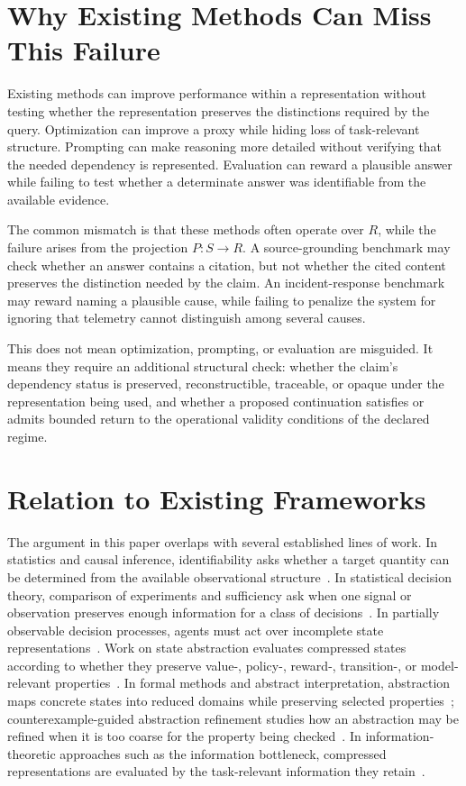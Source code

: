 \documentclass[11pt]{article}
\begin{document}
\section{Why Existing Methods Can Miss This Failure}

Existing methods can improve performance within a representation without testing whether the representation preserves the distinctions required by the query. Optimization can improve a proxy while hiding loss of task-relevant structure. Prompting can make reasoning more detailed without verifying that the needed dependency is represented. Evaluation can reward a plausible answer while failing to test whether a determinate answer was identifiable from the available evidence.

The common mismatch is that these methods often operate over $R$, while the failure arises from the projection $P:S\rightarrow R$. A source-grounding benchmark may check whether an answer contains a citation, but not whether the cited content preserves the distinction needed by the claim. An incident-response benchmark may reward naming a plausible cause, while failing to penalize the system for ignoring that telemetry cannot distinguish among several causes.

This does not mean optimization, prompting, or evaluation are misguided. It means they require an additional structural check: whether the claim's dependency status is preserved, reconstructible, traceable, or opaque under the representation being used, and whether a proposed continuation satisfies or admits bounded return to the operational validity conditions of the declared regime.

\section{Relation to Existing Frameworks}

The argument in this paper overlaps with several established lines of work. In statistics and causal inference, identifiability asks whether a target quantity can be determined from the available observational structure~\cite{Pearl2009}. In statistical decision theory, comparison of experiments and sufficiency ask when one signal or observation preserves enough information for a class of decisions~\cite{Blackwell1953}. In partially observable decision processes, agents must act over incomplete state representations~\cite{Kaelbling1998}. Work on state abstraction evaluates compressed states according to whether they preserve value-, policy-, reward-, transition-, or model-relevant properties~\cite{Li2006}. In formal methods and abstract interpretation, abstraction maps concrete states into reduced domains while preserving selected properties~\cite{Cousot1977}; counterexample-guided abstraction refinement studies how an abstraction may be refined when it is too coarse for the property being checked~\cite{Clarke2000}. In information-theoretic approaches such as the information bottleneck, compressed representations are evaluated by the task-relevant information they retain~\cite{Tishby1999}.
\end{document}
